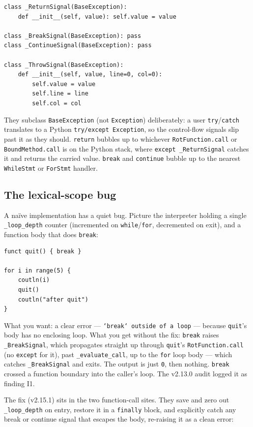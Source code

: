 \documentclass[11pt]{article}
\begin{document}
\begin{lstlisting}[style=pystyle]
class _ReturnSignal(BaseException):
    def __init__(self, value): self.value = value

class _BreakSignal(BaseException): pass
class _ContinueSignal(BaseException): pass

class _ThrowSignal(BaseException):
    def __init__(self, value, line=0, col=0):
        self.value = value
        self.line = line
        self.col = col
\end{lstlisting}

They subclass \texttt{BaseException} (not \texttt{Exception}) deliberately: a user \texttt{try}/\texttt{catch} translates to a Python \texttt{try/except Exception}, so the control-flow signals slip past it as they should. \texttt{return} bubbles up to whichever \texttt{RotFunction.call} or \texttt{BoundMethod.call} is on the Python stack, where \texttt{except \_ReturnSignal} catches it and returns the carried value. \texttt{break} and \texttt{continue} bubble up to the nearest \texttt{WhileStmt} or \texttt{ForStmt} handler.

\subsection{The lexical-scope bug}

A naïve implementation has a quiet bug. Picture the interpreter holding a single \texttt{\_loop\_depth} counter (incremented on \texttt{while}/\texttt{for}, decremented on exit), and a function body that does \texttt{break}:

\begin{lstlisting}[style=rotstyle]
funct quit() { break }

for i in range(5) {
    coutln(i)
    quit()
    coutln("after quit")
}
\end{lstlisting}

What you want: a clear error --- \texttt{`break` outside of a loop} --- because \texttt{quit}'s body has no enclosing loop. What you get without the fix: \texttt{break} raises \texttt{\_BreakSignal}, which propagates straight up through \texttt{quit}'s \texttt{RotFunction.call} (no \texttt{except} for it), past \texttt{\_evaluate\_call}, up to the \texttt{for} loop body --- which catches \texttt{\_BreakSignal} and exits. The output is just \texttt{0}, then nothing. \texttt{break} crossed a function boundary into the caller's loop. The v2.13.0 audit logged it as finding I1.

The fix (v2.15.1) sits in the two function-call sites. They save and zero out \texttt{\_loop\_depth} on entry, restore it in a \texttt{finally} block, and explicitly catch any break or continue signal that escapes the body, re-raising it as a clean error:
\end{document}
